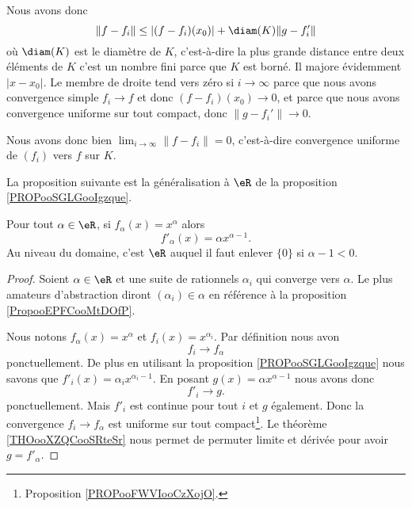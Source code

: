 \begin{normaltext}
\begin{subproof}
		Nous avons donc
		\begin{equation}
			\| f-f_i \|\leq | (f-f_i)(x_0) |+\diam(K)\| g-f'_i \|
		\end{equation}
		où \( \diam(K)\) est le diamètre de \( K\), c'est-à-dire la plus grande distance entre deux éléments de \( K\) c'est un nombre fini parce que \( K\) est borné. Il majore évidemment \( | x-x_0 |\). Le membre de droite tend vers zéro si \( i\to \infty\) parce que nous avons convergence simple \( f_i\to f\) et donc \( (f-f_i)(x_0)\to 0\), et parce que nous avons convergence uniforme sur tout compact, donc \( \| g-f_i' \|\to 0\).

		Nous avons donc bien \( \lim_{i\to \infty}\| f-f_i \|=0\), c'est-à-dire convergence uniforme de \( (f_i)\) vers \( f\) sur \( K\).

	\end{subproof}
\end{normaltext}

La proposition suivante est la généralisation à \( \eR\) de la proposition \ref{PROPooSGLGooIgzque}.
\begin{proposition}     \label{PROPooKIASooGngEDh}
	Pour tout \( \alpha\in \eR\), si \( f_{\alpha}(x)=x^{\alpha}\) alors
	\begin{equation}
		f'_{\alpha}(x)=\alpha x^{\alpha-1}.
	\end{equation}
	Au niveau du domaine, c'est \( \eR\) auquel il faut enlever \( \{ 0 \}\) si \( \alpha-1<0\).
\end{proposition}

\begin{proof}
	Soient \( \alpha\in \eR\) et une suite de rationnels \( \alpha_i\) qui converge vers \( \alpha\). Le plus amateurs d'abstraction diront \( (\alpha_i)\in \alpha\) en référence à la proposition \ref{PropooEPFCooMtDOfP}.

	Nous notons \( f_{\alpha}(x)=x^{\alpha}\) et \( f_i(x)=x^{\alpha_i}\). Par définition nous avon
	\begin{equation}
		f_i\to f_{\alpha}
	\end{equation}
	ponctuellement. De plus en utilisant la proposition \ref{PROPooSGLGooIgzque} nous savons que \( f'_i(x)=\alpha_i x^{\alpha_i-1}\). En posant \( g(x)=\alpha x^{\alpha-1}\) nous avons donc
	\begin{equation}
		f'_i\to g.
	\end{equation}
	ponctuellement. Mais \( f'_i\) est continue pour tout \( i\) et \( g\) également. Donc la convergence \( f_i\to f_{\alpha}\) est uniforme sur tout compact\footnote{Proposition \ref{PROPooFWVIooCzXojO}.}. Le théorème \ref{THOooXZQCooSRteSr} nous permet de permuter limite et dérivée pour avoir \( g=f'_{\alpha}\).
\end{proof}

